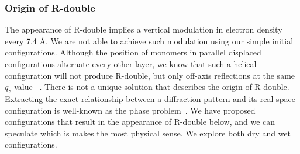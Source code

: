 \documentclass[journal=jpcbfk,manusciprt=article]{achemso}
\begin{document}
  \subsubsection{Origin of R-double}\label{section:rdouble}
  
  
  The appearance of R-double implies a vertical modulation in electron density every 7.4 \AA.
  We are not able to achieve such modulation using our simple initial configurations. Although
  the position of monomers in parallel displaced configurations alternate every other layer, 
  we know that such a helical configuration will not produce R-double, but only off-axis 
  reflections at the same $q_z$ value ~\cite{harburn_atlas_1975}. There is not a unique solution
  that describes the origin of R-double. Extracting the exact relationship between a diffraction
  pattern and its real space configuration is well-known as the phase problem~\cite{taylor_phase_2003}.    
  We have proposed configurations that result in the appearance of R-double below, and we can 
  speculate which is makes the most physical sense. We explore both dry and wet configurations.
 
\end{document}
